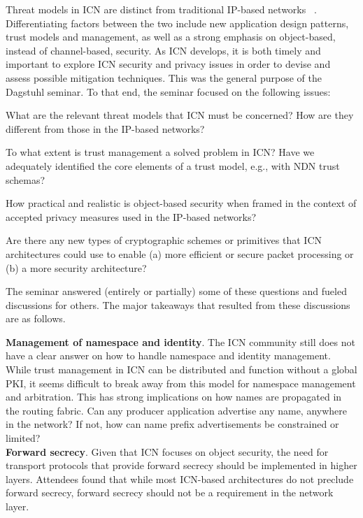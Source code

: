 \documentclass{sig-alternate-10pt}
\makeatletter
\renewcommand{\paragraph}[1]{\vspace*{0.03in}\noindent{\bf #1.}\hspace{0.25ex \@plus1ex \@minus.2ex}}
\makeatother
\begin{document}
\paragraph{Current Research Challenges}
Threat models in ICN are distinct from traditional IP-based networks ~\cite{wsv-bdpts-13,gtuz-ddndn-13}. Differentiating factors between the two include
new application design patterns, trust models and management, as well as a strong
emphasis on object-based, instead of channel-based, security. As ICN develops, it is both
timely and important to explore ICN security and privacy issues in order to devise and
assess possible mitigation techniques. This was the general purpose of the Dagstuhl
seminar. To that end, the seminar focused on the following issues:
%
\begin{compactitem}
\item What are the relevant threat models that ICN must be concerned? How are
they different from those in the IP-based networks?
\item To what extent is trust management a solved problem in ICN? Have we adequately
identified the core elements of a trust model, e.g., with NDN trust schemas?
\item How practical and realistic is object-based security when framed in the
context of accepted privacy measures used in the IP-based networks?
\item Are there any new types of cryptographic schemes or primitives that ICN architectures
could use to enable (a) more efficient or secure packet
processing or (b) a more security architecture?
\end{compactitem}
%
The seminar answered (entirely or partially) some of these questions and fueled discussions
for others. The major takeaways that resulted from these discussions are as follows.

\noindent
{\bf Management of namespace and identity}. The ICN community still does not have a clear answer on how to handle
namespace and identity management. While trust management in ICN can be distributed and function without a global PKI, it seems difficult to break away from this model for namespace management and arbitration. This has strong implications on how names are
propagated in the routing fabric. Can any producer application advertise any name,
anywhere in the network? If not, how can name prefix advertisements be constrained or limited? \\

\noindent
{\bf Forward secrecy}. Given that ICN focuses on object security, the need for transport
protocols that provide forward secrecy should be implemented in higher layers. Attendees
found that while most ICN-based architectures do not preclude forward secrecy, forward secrecy should
not be a requirement in the network layer.\\
\end{document}
